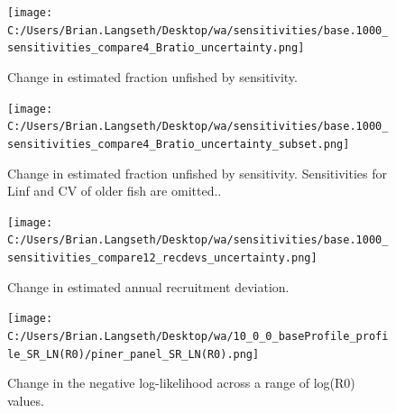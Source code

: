 \documentclass[11pt,
  english,
  a4paper,
]{article}
\begin{document}
\tagmcend\tagstructend


\begin{figure}
\centering
\texttt{[image: C:/Users/Brian.Langseth/Desktop/wa/sensitivities/base.1000\_sensitivities\_compare4\_Bratio\_uncertainty.png]}
\caption{Change in estimated fraction unfished by sensitivity.\label{fig:sens-depl}}
\end{figure}

\tagmcend\tagstructend


\begin{figure}
\centering
\texttt{[image: C:/Users/Brian.Langseth/Desktop/wa/sensitivities/base.1000\_sensitivities\_compare4\_Bratio\_uncertainty\_subset.png]}
\caption{Change in estimated fraction unfished by sensitivity. Sensitivities for Linf and CV of older fish are omitted..\label{fig:sens-depl-subset}}
\end{figure}

\tagmcend\tagstructend


\begin{figure}
\centering
\texttt{[image: C:/Users/Brian.Langseth/Desktop/wa/sensitivities/base.1000\_sensitivities\_compare12\_recdevs\_uncertainty.png]}
\caption{Change in estimated annual recruitment deviation.\label{fig:sens-recdev}}
\end{figure}

\tagmcend\tagstructend


\begin{figure}
\centering
\texttt{[image: C:/Users/Brian.Langseth/Desktop/wa/10\_0\_0\_baseProfile\_profile\_SR\_LN(R0)/piner\_panel\_SR\_LN(R0).png]}
\caption{Change in the negative log-likelihood across a range of log(R0) values.\label{fig:r0-profile}}
\end{figure}

\tagmcend\tagstructend

\end{document}
